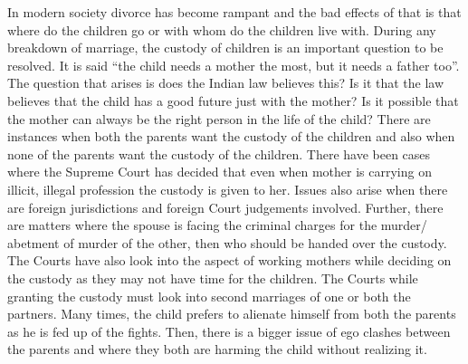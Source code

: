 \begin{multicols}{2}
\noi
In modern society divorce has become rampant and the bad effects of that is that where do the
children go or with whom do the children live with. During any breakdown of marriage, the
custody of children is an important question to be resolved. It is said “the child needs a mother
the most, but it needs a father too”. The question that arises is does the Indian law believes this?
Is it that the law believes that the child has a good future just with the mother? Is it possible that
the mother can always be the right person in the life of the child? There are instances when both
the parents want the custody of the children and also when none of the parents want the custody
of the children. There have been cases where the Supreme Court has decided that even when
mother is carrying on illicit, illegal profession the custody is given to her. Issues also arise when
there are foreign jurisdictions and foreign Court judgements involved. Further, there are matters
where the spouse is facing the criminal charges for the murder/ abetment of murder of the other,
then who should be handed over the custody. The Courts have also look into the aspect of working
mothers while deciding on the custody as they may not have time for the children. The Courts
while granting the custody must look into second marriages of one or both the partners. Many
times, the child prefers to alienate himself from both the parents as he is fed up of the fights. Then,
there is a bigger issue of ego clashes between the parents and where they both are harming the
child without realizing it.

\vspace{-.1cm}


\vspace{-.1cm}


\end{multicols}
